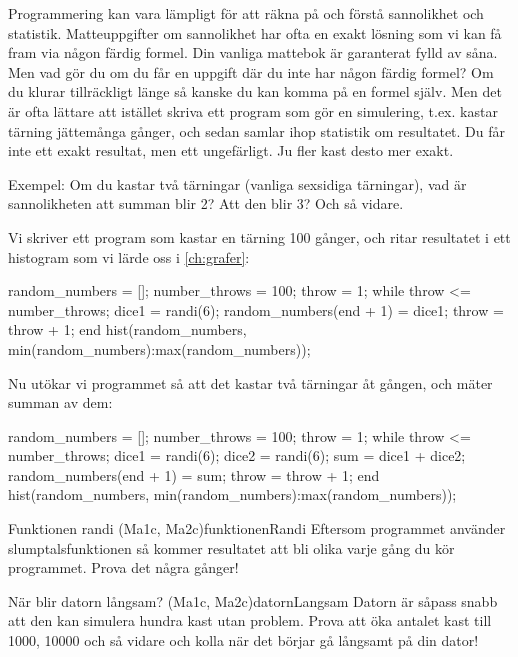 Programmering kan vara lämpligt för att räkna på och förstå sannolikhet och statistik. Matteuppgifter om sannolikhet har ofta en exakt lösning som vi kan få fram via någon färdig formel. Din vanliga mattebok är garanterat fylld av såna. Men vad gör du om du får en uppgift där du inte har någon färdig formel? Om du klurar tillräckligt länge så kanske du kan komma på en formel själv. Men det är ofta lättare att istället skriva ett program som gör en simulering, t.ex. kastar tärning jättemånga gånger, och sedan samlar ihop statistik om resultatet. Du får inte ett exakt resultat, men ett ungefärligt. Ju fler kast desto mer exakt.

Exempel: Om du kastar två tärningar (vanliga sexsidiga tärningar), vad är sannolikheten att summan blir 2? Att den blir 3? Och så vidare.

Vi skriver ett program som kastar en tärning 100 gånger, och ritar resultatet i ett histogram som vi lärde oss i \autoref{ch:grafer}:
\vspace{10pt}
\begin{matlab}
random_numbers = [];
number_throws = 100;
throw = 1;
while throw <= number_throws;
	dice1 = randi(6);
	random_numbers(end + 1) = dice1;
	throw = throw + 1;
end
hist(random_numbers, min(random_numbers):max(random_numbers));
\end{matlab}

Nu utökar vi programmet så att det kastar två tärningar åt gången, och mäter summan av dem:
\vspace{10pt}
\begin{matlab}
random_numbers = [];
number_throws = 100; %
throw = 1;
while throw <= number_throws;
	dice1 = randi(6);
	dice2 = randi(6);
	sum = dice1 + dice2;
	random_numbers(end + 1) = sum;
	throw = throw + 1;
end
hist(random_numbers, min(random_numbers):max(random_numbers));
\end{matlab}



\begin{matteovning}{Funktionen randi (Ma1c, Ma2c)}{funktionenRandi}
Eftersom programmet använder slumptalsfunktionen  så kommer resultatet att bli olika varje gång du kör programmet. Prova det några gånger!
\end{matteovning}

\begin{matteovning}{När blir datorn långsam? (Ma1c, Ma2c)}{datornLangsam}
Datorn är såpass snabb att den kan simulera hundra kast utan problem. Prova att öka antalet kast till 1000, 10000 och så vidare och kolla när det börjar gå långsamt på din dator!
\end{matteovning}

